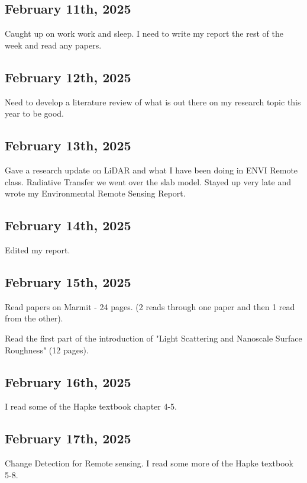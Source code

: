 \documentclass{article}
\begin{document}
\subsection{February 11th, 2025}
Caught up on work work and sleep. I need to write my report the rest of the week and read any papers. 


\subsection{February 12th, 2025}
Need to develop a literature review of what is out there on my research topic this year to be good. 

\subsection{February 13th, 2025}
Gave a research update on LiDAR and what I have been doing in ENVI Remote class. Radiative Transfer we went over the slab model. 
Stayed up very late and wrote my Environmental Remote Sensing Report. 

\subsection{February 14th, 2025}
Edited my report. 

\subsection{February 15th, 2025}
Read papers on Marmit - 24 pages. (2 reads through one paper and then 1 read from the other). 

Read the first part of the introduction of "Light Scattering and Nanoscale Surface Roughness" (12 pages).

\subsection{February 16th, 2025}
I read some of the Hapke textbook chapter 4-5.

\subsection{February 17th, 2025}

Change Detection for Remote sensing. 
I read some more of the Hapke textbook 5-8. 
\end{document}
